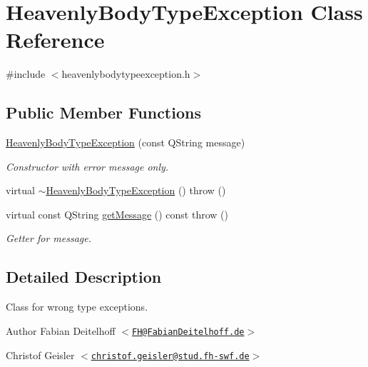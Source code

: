 \hypertarget{classHeavenlyBodyTypeException}{
\section{\-Heavenly\-Body\-Type\-Exception \-Class \-Reference}
\label{dc/d03/classHeavenlyBodyTypeException}
}


{\ttfamily \#include $<$heavenlybodytypeexception.\-h$>$}

\subsection*{\-Public \-Member \-Functions}
\begin{DoxyCompactItemize}
\item 
\hyperlink{classHeavenlyBodyTypeException_a5b5967457d719dcead7768cc6ae59569}{\-Heavenly\-Body\-Type\-Exception} (const \-Q\-String message)
\begin{DoxyCompactList}\small\item\em \-Constructor with error message only. \end{DoxyCompactList}\item 
virtual \hyperlink{classHeavenlyBodyTypeException_ae55c7fe9eca89dd91a0bb6e6f460b174}{$\sim$\-Heavenly\-Body\-Type\-Exception} ()  throw ()
\item 
virtual const \-Q\-String \hyperlink{classHeavenlyBodyTypeException_a892a0588f600e74f406db6c0a898fcca}{get\-Message} () const   throw ()
\begin{DoxyCompactList}\small\item\em \-Getter for message. \end{DoxyCompactList}\end{DoxyCompactItemize}


\subsection{\-Detailed \-Description}
\-Class for wrong type exceptions.

\begin{DoxyAuthor}{\-Author}
\-Fabian \-Deitelhoff $<$\href{mailto:FH@FabianDeitelhoff.de}{\tt \-F\-H@\-Fabian\-Deitelhoff.\-de}$>$ 

\-Christof \-Geisler $<$\href{mailto:christof.geisler@stud.fh-swf.de}{\tt christof.\-geisler@stud.\-fh-\/swf.\-de}$>$ 
\end{DoxyAuthor}



